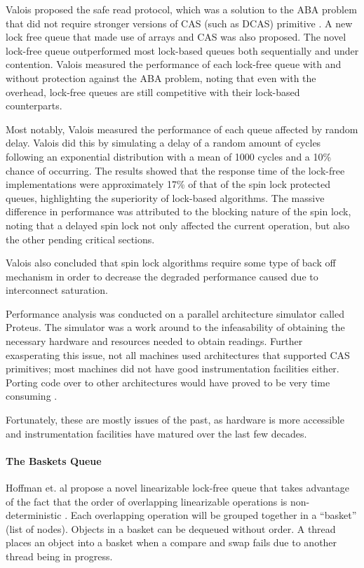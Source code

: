 \documentclass[a4paper, 12pt, titlepage]{article}
\begin{document}
\begin{onehalfspacing}
Valois proposed the safe read protocol, which was a solution to the ABA problem that did not require stronger versions of CAS (such as DCAS) primitive \cite{valois1994implementing, valois1995lock}. A new lock free queue that made use of arrays and CAS was also proposed. The novel lock-free queue outperformed most lock-based queues both sequentially and under contention. Valois measured the performance of each lock-free queue with and without protection against the ABA problem, noting that even with the overhead, lock-free queues are still competitive with their lock-based counterparts.

Most notably, Valois measured the performance of each queue affected by random delay. Valois did this by simulating a delay of a random amount of cycles following an exponential distribution with a mean of 1000 cycles and a 10\% chance of occurring. The results showed that the response time of the lock-free implementations were approximately 17\% of that of the spin lock protected queues, highlighting the superiority of lock-based algorithms. The massive difference in performance was attributed to the blocking nature of the spin lock, noting that a delayed spin lock not only affected the current operation, but also the other pending critical sections.

Valois also concluded that spin lock algorithms require some type of back off mechanism in order to decrease the degraded performance caused due to interconnect saturation.

Performance analysis was conducted on a parallel architecture simulator called Proteus. The simulator was a work around to the infeasability of obtaining the necessary hardware and resources needed to obtain readings. Further exasperating this issue, not all machines used architectures that supported CAS primitives; most machines did not have good instrumentation facilities either. Porting code over to other architectures would have proved to be very time consuming \cite{valois1994implementing, valois1995lock}. 

Fortunately, these are mostly issues of the past, as hardware is more accessible and instrumentation facilities have matured over the last few decades.

\paragraph{The Baskets Queue}
Hoffman et. al propose a novel linearizable lock-free queue that takes advantage of the fact that the order of overlapping linearizable operations is non-deterministic \cite{hoffman2007baskets}. Each overlapping operation will be grouped together in a ``basket'' (list of nodes). Objects in a basket can be dequeued without order. A thread places an object into a basket when a compare and swap fails due to another thread being in progress.


\end{onehalfspacing}
\end{document}

